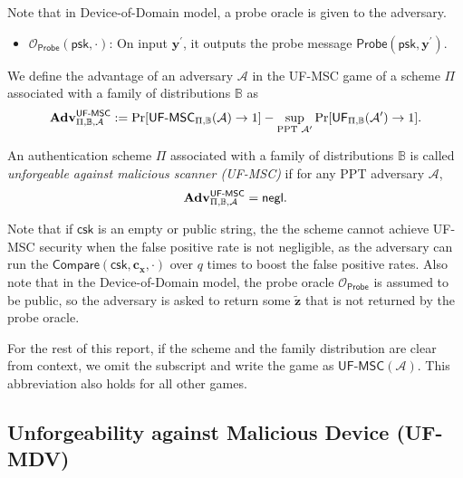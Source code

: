 Note that in Device-of-Domain model, a probe oracle is given to the adversary.

\begin{itemize}
	\item $\mathcal{O}_\textsf{Probe}(\textsf{psk}, \cdot)$: On input $\mathbf{y}^\prime$, it outputs the probe message $\textsf{Probe}(\textsf{psk}, \mathbf{y}^\prime)$.
\end{itemize}

We define the advantage of an adversary $\mathcal{A}$ in the \textsf{UF-MSC} game of a scheme $\Pi$ associated with a family of distributions $\mathbb{B}$ as
\[
	\mathbf{Adv}^{\textsf{UF-MSC}}_{\Pi, \mathbb{B}, \mathcal{A}} := \Pr[{\textsf{UF-MSC}}_{\Pi, \mathbb{B}}(\mathcal{A}) \to 1] -
	\sup_{\text{PPT } \mathcal{A}^\prime} \Pr[\textsf{UF}_{\Pi, \mathbb{B}}(\mathcal{A}^\prime) \to 1].
\]

An authentication scheme $\Pi$ associated with a family of distributions $\mathbb{B}$ is called \emph{unforgeable against malicious scanner (UF-MSC)} if for any PPT adversary $\mathcal{A}$,
\[
	\mathbf{Adv}^{\textsf{UF-MSC}}_{\Pi, \mathbb{B}, \mathcal{A}} = \mathsf{negl}.
\]

Note that if $\textsf{csk}$ is an empty or public string, the the scheme cannot achieve UF-MSC security when the false positive rate is not negligible, as the adversary can run the $\textsf{Compare}(\textsf{csk}, \mathbf{c_x}, \cdot)$ over $q$ times to boost the false positive rates.
Also note that in the Device-of-Domain model, the probe oracle $\mathcal{O}_\textsf{Probe}$ is assumed to be public, so the adversary is asked to return some $\mathbf{\tilde{z}}$ that is not returned by the probe oracle.

For the rest of this report, if the scheme and the family distribution are clear from context, we omit the subscript and write the game as $\textsf{UF-MSC}(\mathcal{A})$. This abbreviation also holds for all other games.



\subsection{Unforgeability against Malicious Device (UF-MDV)}
\label{sec:uf-mdv_game}

